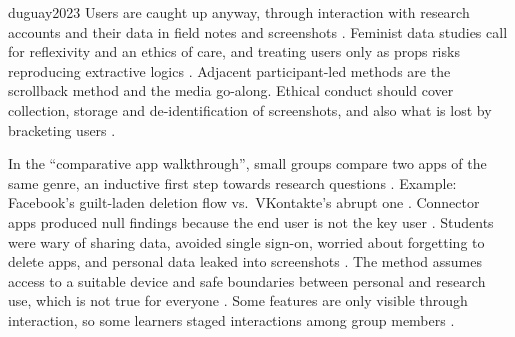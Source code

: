 \begin{papercard}{duguay2023}
 Users are caught up anyway, through interaction with research accounts and their data in field notes and screenshots . Feminist data studies call for reflexivity and an ethics of care, and treating users only as props risks reproducing extractive logics . Adjacent participant-led methods are the scrollback method and the media go-along. Ethical conduct should cover collection, storage and de-identification of screenshots, and also what is lost by bracketing users .

 In the ``comparative app walkthrough'', small groups compare two apps of the same genre, an inductive first step towards research questions . Example: Facebook's guilt-laden deletion flow vs.\ VKontakte's abrupt one . Connector apps produced null findings because the end user is not the key user . Students were wary of sharing data, avoided single sign-on, worried about forgetting to delete apps, and personal data leaked into screenshots . The method assumes access to a suitable device and safe boundaries between personal and research use, which is not true for everyone . Some features are only visible through interaction, so some learners staged interactions among group members .


\end{papercard}
